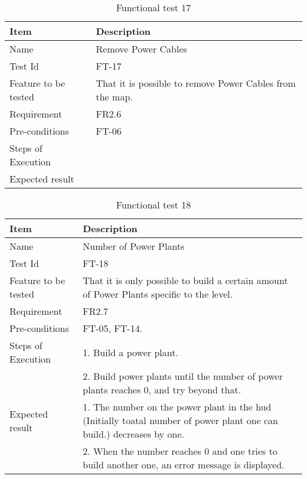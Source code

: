 \begin{table}[H]
\centering
	\begin{tabular}{ l | p{8cm} }
		\hline
		{\bf Item} & {\bf Description} \\ \hline
		Name & Remove Power Cables \\ 
		Test Id & FT-17 \\ 
		Feature to be tested & That it is possible to remove Power Cables from the map. \\ 
		Requirement & FR2.6 \\ 
		Pre-conditions & FT-06 \\ 
		Steps of Execution &  \\ 
		Expected result & \\ 
	\end{tabular}
	\caption{Functional test 17}
\end{table}

\begin{table}[H]
\centering
	\begin{tabular}{ l | p{8cm} }
		\hline
		{\bf Item} & {\bf Description} \\ \hline
		Name & Number of Power Plants \\ 
		Test Id & FT-18 \\ 
		Feature to be tested & That it is only possible to build a certain amount of Power Plants specific to the level. \\ 
		Requirement & FR2.7 \\ 
		Pre-conditions & FT-05, FT-14. \\ 
		Steps of Execution & 1. Build a power plant. \\ 
		& 2. Build power plants until the number of power plants reaches 0, and try beyond that. \\
		Expected result & 1. The number on the power plant in the hud (Initially toatal number of power plant one can build.) decreases by one. \\
		& 2. When the number reaches 0 and one tries to build another one, an error message is displayed. \\
	\end{tabular}
	\caption{Functional test 18}
\end{table}

